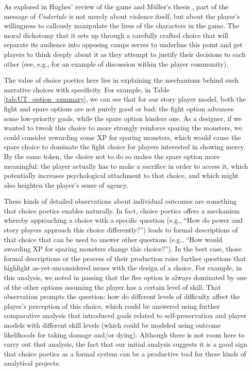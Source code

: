 \documentclass[arts,article,accept,moreauthors,pdftex,10pt,a4paper]{Definitions/mdpi}
\begin{document}
As explored in Hughes' review of the game and Müller's thesis \citep{hughes2015undertale,muller2017undertale}, part of the message of \emph{Undertale} is not merely about violence itself, but about the player's willingness to callously manipulate the lives of the characters in the game.
%
The moral dichotomy that it sets up through a carefully crafted choice that will separate its audience into opposing camps serves to underline this point and get players to think deeply about it as they attempt to justify their decisions to each other (see, e.g., \cite{oh2016genocide} for an example of discussion within the player community).


The value of choice poetics here lies in explaining the mechanisms behind such narrative choices with specificity.
%
For example, in Table \ref{tab:UT_option_summary}, we can see that for our story player model, both the fight and spare options are not purely good or bad: the fight option advances some low-priority goals, while the spare option hinders one.
%
As a designer, if we wanted to tweak this choice to more strongly reinforce sparing the monsters, we could consider rewarding some XP for sparing monsters, which would cause the spare choice to dominate the fight choice for players interested in showing mercy.
%
By the same token, the choice not to do so makes the spare option more meaningful: the player actually has to make a sacrifice in order to access it, which potentially increases psychological attachment to that choice, and which might also heighten the player's sense of agency.


These kinds of detailed observations about individual outcomes are something that choice poetics enables naturally.
%
In fact, choice poetics offers a mechanism whereby approaching a choice with a specific question (e.g., ``How do power and story players approach this choice differently?'') leads to formal descriptions of that choice that can be used to answer other questions (e.g., ``How would awarding XP for sparing monsters change this choice?'').
%
In the best case, those formal descriptions or the process of their production raise further questions that highlight as-yet-unconsidered issues with the design of a choice.
%
For example, in this analysis, we noted in passing that the flee option is always dominated by one of the other options assuming the player has a certain level of skill.
%
That observation prompts the question: how do different levels of difficulty affect the player's perception of this choice, which could be answered using further comparative analysis that introduced goals related to self-preservation and player models with different skill levels (which could be modeled using outcome likelihoods for taking damage and/or dying).
%
Although there is not room here to carry out that analysis, the fact that our initial analysis suggests it is a good sign that choice poetics as a formal system can be a productive tool for these kinds of analytical projects.
\end{document}
